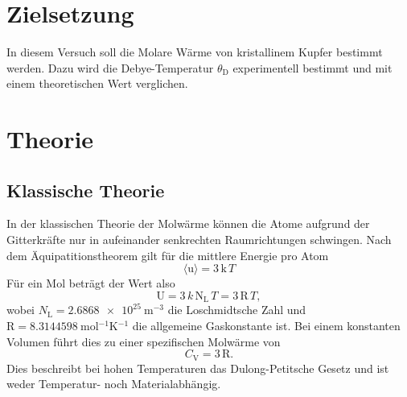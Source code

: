 \section{Zielsetzung}
\label{sec:Zielsetzung}
In diesem Versuch soll die Molare Wärme von kristallinem Kupfer bestimmt werden.
Dazu wird die Debye-Temperatur $\theta_\text{D}$ experimentell bestimmt und mit einem theoretischen
Wert verglichen.

\section{Theorie}
\label{sec:Theorie}

\subsection{Klassische Theorie}
\label{sec:Klassische Theorie}
In der klassischen Theorie der Molwärme können die Atome aufgrund der Gitterkräfte nur
in aufeinander senkrechten Raumrichtungen schwingen. Nach dem Äquipatitionstheorem
gilt für die mittlere Energie pro Atom
\begin{equation}
  \langle \text{u} \rangle = 3\,\text{k}\,T
\end{equation}
Für ein Mol beträgt der Wert also
\begin{equation}
  \text{U} = 3\, k\, \text{N}_\text{L}\, T = 3\,\text{R}\,T,
\end{equation}
wobei $N_\text{L} = \SI{2,6868e25}{\metre^{-3}}$ die Loschmidtsche Zahl und $\text{R} = \SI{8,3144598}{\mole^{-1}\kelvin^{-1}}$ die allgemeine Gaskonstante ist.
Bei einem konstanten Volumen führt dies zu einer spezifischen Molwärme von
\begin{equation}
  C_\text{V} = 3\,\text{R}.
\end{equation}
Dies beschreibt bei hohen Temperaturen das Dulong-Petitsche Gesetz und ist weder
Temperatur- noch Materialabhängig.

